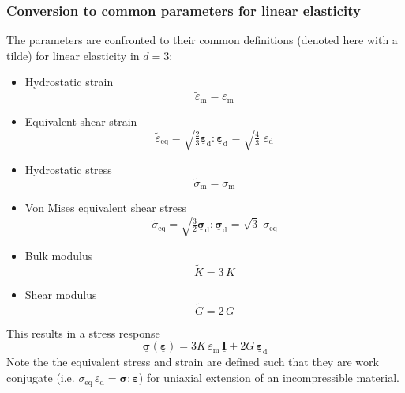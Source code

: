 \documentclass[times,namecite]{goose-article}
\newcommand\T[1]{\underline{\bm{{#1}}}}
\begin{document}
\subsubsection{Conversion to common parameters for linear elasticity}

The parameters are confronted to their common definitions (denoted here with a tilde) for linear elasticity in $d = 3$:

\begin{itemize}
  \item Hydrostatic strain
  \begin{equation}
    \tilde{\varepsilon}_\mathrm{m} = \varepsilon_\mathrm{m}
  \end{equation}
  \item Equivalent shear strain
  \begin{equation}
    \tilde{\varepsilon}_\mathrm{eq}
    = \sqrt{\tfrac{2}{3} \T{\varepsilon}_\mathrm{d} : \T{\varepsilon}_\mathrm{d} }
    = \sqrt{\tfrac{4}{3}} \; \varepsilon_\mathrm{d}
  \end{equation}
  \item Hydrostatic stress
  \begin{equation}
    \tilde{\sigma}_\mathrm{m} = \sigma_\mathrm{m}
  \end{equation}
  \item Von Mises equivalent shear stress
  \begin{equation}
    \tilde{\sigma}_\mathrm{eq}
    = \sqrt{\tfrac{3}{2} \T{\sigma}_\mathrm{d} : \T{\sigma}_\mathrm{d} }
    = \sqrt{3} \; \sigma_\mathrm{eq}
  \end{equation}
  \item Bulk modulus
  \begin{equation}
    \tilde{K} = 3 \, K
  \end{equation}
  \item Shear modulus
  \begin{equation}
    \tilde{G} = 2 \, G
  \end{equation}
\end{itemize}
This results in a stress response
\begin{equation}
  \T{\sigma} ( \T{\varepsilon} )
  =
  3 K \, \varepsilon_\mathrm{m} \, \T{I}
  +
  2 G \, \T{\varepsilon}_\mathrm{d}
\end{equation}
Note the the equivalent stress and strain are defined such that they are work conjugate (i.e. $\sigma_\mathrm{eq} \, \varepsilon_\mathrm{d} = \T{\sigma} : \T{\varepsilon}$) for uniaxial extension of an incompressible material.
\end{document}
